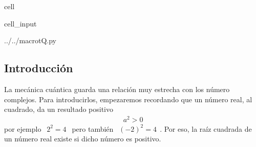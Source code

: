 \documentclass[letterpaper,10pt,english]{jupyterBook}
\begin{document}
\begin{sphinxuseclass}{cell}\begin{sphinxVerbatimInput}

\begin{sphinxuseclass}{cell_input}
\begin{sphinxVerbatim}[commandchars=\\\{\}]
 ../../macro\PYGZus{}tQ.py
 
   

   
   
   
   
   
  
\end{sphinxVerbatim}

\end{sphinxuseclass}\end{sphinxVerbatimInput}

\end{sphinxuseclass}

\subsection{Introducción}
\label{\detokenize{docs/Part_01_Formalismo/Chapter_01_02_Formalismo_matem_xe1tico/01_01_Numeros_Complejos_myst:introduccion}}
\sphinxAtStartPar
La mecánica cuántica guarda una relación muy estrecha con los número complejos. Para introducirlos, empezaremos recordando que un número real, al cuadrado,  da un resultado positivo
\begin{equation*}
\begin{split}a^2 >0\end{split}
\end{equation*}
\sphinxAtStartPar
por ejemplo \(~~2^2 =  4~~\) pero también \(~~(-2)^2 = 4~~\). Por eso, la raíz cuadrada de un número real  existe si dicho número es positivo.
\end{document}

